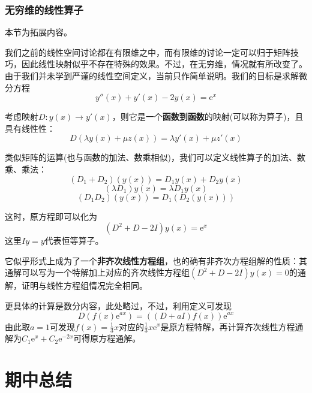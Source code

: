 \documentclass[a4paper,UTF8,fontset=windows]{ctexart}
\newcommand*{\note}{\noindent *}
\begin{document}
\subsubsection{无穷维的线性算子}
\note 本节为拓展内容。

我们之前的线性空间讨论都在有限维之中，而有限维的讨论一定可以归于矩阵技巧，因此线性映射似乎不存在特殊的效果。不过，在无穷维，情况就有所改变了。由于我们并未学到严谨的线性空间定义，当前只作简单说明。我们的目标是求解微分方程
$$y''(x)+y'(x)-2y(x)=\mathrm{e}^x$$

考虑映射$D:y(x)\to y'(x)$，则它是一个\textbf{函数到函数}的映射(可以称为算子)，且具有线性性：
$$D(\lambda y(x)+\mu z(x))=\lambda y'(x)+\mu z'(x)$$

类似矩阵的运算(也与函数的加法、数乘相似)，我们可以定义线性算子的加法、数乘、乘法：
$$(D_1+D_2)(y(x))=D_1y(x)+D_2y(x)$$
$$(\lambda D_1)y(x)=\lambda D_1y(x)$$
$$(D_1D_2)(y(x))=D_1(D_2(y(x)))$$

这时，原方程即可以化为
$$(D^2+D-2I)y(x)=\mathrm{e}^x$$
这里$Iy=y$代表恒等算子。

它似乎形式上成为了一个\textbf{非齐次线性方程组}，也的确有非齐次方程组解的性质：其通解可以写为一个特解加上对应的齐次线性方程组$(D^2+D-2I)y(x)=0$的通解，证明与线性方程组情况完全相同。

更具体的计算是数分内容，此处略过，不过，利用定义可发现
$$D(f(x)\mathrm{e}^{ax})=((D+aI)f(x))\mathrm{e}^{ax}$$
由此取$a=1$可发现$f(x)=\frac{1}{3}x$对应的$\frac{1}{3}x\mathrm{e}^x$是原方程特解，再计算齐次线性方程通解为$C_1\mathrm{e}^x+C_2\mathrm{e}^{-2x}$可得原方程通解。

\section{期中总结}
\end{document}
